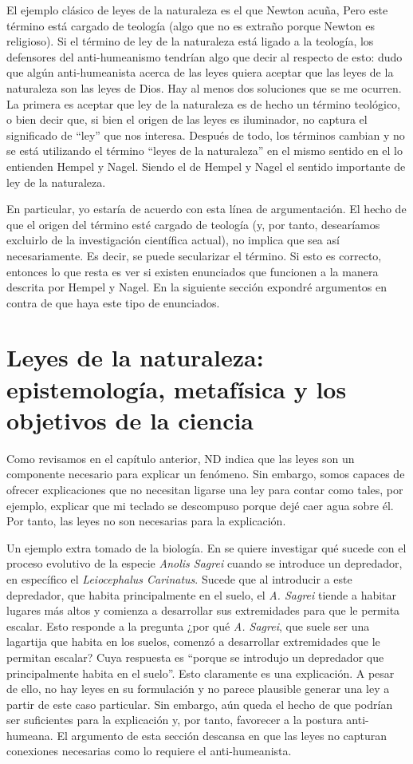 El ejemplo clásico de leyes de la naturaleza es el que Newton acuña, Pero este término está cargado de teología (algo que no es extraño porque Newton es religioso). Si el término de ley de la naturaleza está ligado a la teología, los defensores del anti-humeanismo tendrían algo que decir al respecto de esto: dudo que algún anti-humeanista acerca de las leyes quiera aceptar que las leyes de la naturaleza son las leyes de Dios. Hay al menos dos soluciones que se me ocurren. La primera es aceptar que ley de la naturaleza es de hecho un término teológico, o bien decir que, si bien el origen de las leyes es iluminador, no captura el significado de ``ley'' que nos interesa. Después de todo, los términos cambian y no se está utilizando el término ``leyes de la naturaleza'' en el mismo sentido en el lo entienden Hempel y Nagel. Siendo el de Hempel y Nagel el sentido importante de ley de la naturaleza.

En particular, yo estaría de acuerdo con esta línea de argumentación. El hecho de que el origen del término esté cargado de teología (y, por tanto, desearíamos excluirlo de la investigación científica actual), no implica que sea así necesariamente. Es decir, se puede secularizar el término. Si esto es correcto, entonces lo que resta es ver si existen enunciados que funcionen a la manera descrita por Hempel y Nagel. En la siguiente sección expondré argumentos en contra de que haya este tipo de enunciados.

\section{Leyes de la naturaleza: epistemología, metafísica y los objetivos de la ciencia}

\noindent Como revisamos en el capítulo anterior, ND indica que las leyes son un componente necesario para explicar un fenómeno. Sin embargo, somos capaces de ofrecer explicaciones que no necesitan ligarse una ley para contar como tales, por ejemplo, explicar que mi teclado se descompuso porque dejé caer agua sobre él. Por tanto, las leyes no son necesarias para la explicación.

Un ejemplo extra tomado de la biología. En \cite{Losos2004} se quiere investigar qué sucede con el proceso evolutivo de la especie \textit{Anolis Sagrei} cuando se introduce un depredador, en específico el \textit{Leiocephalus Carinatus}. Sucede que al introducir a este depredador, que habita principalmente en el suelo, el \textit{A. Sagrei} tiende a habitar lugares más altos y comienza a desarrollar sus extremidades para que le permita escalar. Esto responde a la pregunta ¿por qué \textit{A. Sagrei}, que suele ser una lagartija que habita en los suelos, comenzó a desarrollar extremidades que le permitan escalar? Cuya respuesta es ``porque se introdujo un depredador que principalmente habita en el suelo''. Esto claramente es una explicación. A pesar de ello, no hay leyes en su formulación y no parece plausible generar una ley a partir de este caso particular. Sin embargo, aún queda el hecho de que podrían ser suficientes para la explicación y, por tanto, favorecer a la postura anti-humeana. El argumento de esta sección descansa en que las leyes no capturan conexiones necesarias como lo requiere el anti-humeanista.

